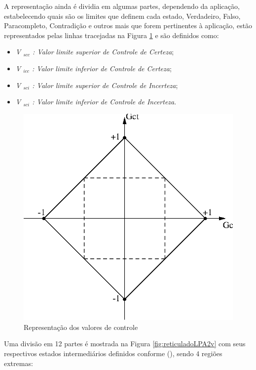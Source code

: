 A representação ainda é dividia em algumas partes, dependendo da aplicação, estabelecendo quais são os limites que definem cada estado, Verdadeiro, Falso, Paracompleto, Contradição e outros mais que forem pertinentes à aplicação, estão representados pelas linhas tracejadas na Figura \ref{fig:valorControle} e são definidos como:

\begin{itemize}
\item \emph{V $_{scc}$ : Valor limite superior de Controle de Certeza};
\item \emph{V $_{icc}$ : Valor limite inferior de Controle de Certeza};
\item \emph{V $_{sci}$ : Valor limite superior de Controle de Incerteza};
\item \emph{V $_{sci}$ : Valor limite inferior de Controle de Incerteza}.

\end{itemize}

\begin{figure}[!htb]
\center\includegraphics[scale=1.0]{./pic/C429valorControle.eps}
\caption{Representação dos valores de controle}
\label{fig:valorControle}
\end{figure}

Uma divisão em 12 partes é mostrada na Figura \ref{fig:reticuladoLPA2v} com seus respectivos estados intermediários definidos conforme \citeauthor{JoaoInacio}(\citeyear{JoaoInacio}), sendo 4 regiões extremas:


